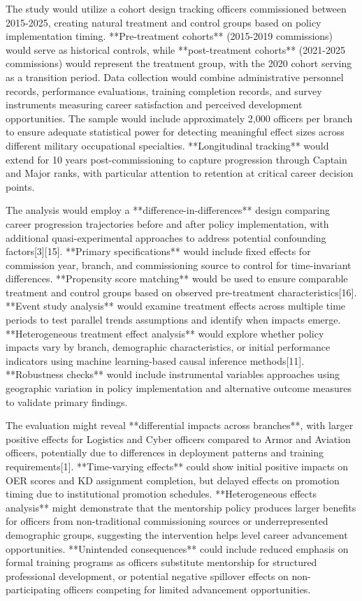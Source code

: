 \documentclass[main.tex]{subfiles}
\begin{document}
The study would utilize a cohort design tracking officers commissioned between 2015-2025, creating natural treatment and control groups based on policy implementation timing. **Pre-treatment cohorts** (2015-2019 commissions) would serve as historical controls, while **post-treatment cohorts** (2021-2025 commissions) would represent the treatment group, with the 2020 cohort serving as a transition period. Data collection would combine administrative personnel records, performance evaluations, training completion records, and survey instruments measuring career satisfaction and perceived development opportunities. The sample would include approximately 2,000 officers per branch to ensure adequate statistical power for detecting meaningful effect sizes across different military occupational specialties. **Longitudinal tracking** would extend for 10 years post-commissioning to capture progression through Captain and Major ranks, with particular attention to retention at critical career decision points.


The analysis would employ a **difference-in-differences** design comparing career progression trajectories before and after policy implementation, with additional quasi-experimental approaches to address potential confounding factors[3][15]. **Primary specifications** would include fixed effects for commission year, branch, and commissioning source to control for time-invariant differences. **Propensity score matching** would be used to ensure comparable treatment and control groups based on observed pre-treatment characteristics[16]. **Event study analysis** would examine treatment effects across multiple time periods to test parallel trends assumptions and identify when impacts emerge. **Heterogeneous treatment effect analysis** would explore whether policy impacts vary by branch, demographic characteristics, or initial performance indicators using machine learning-based causal inference methods[11]. **Robustness checks** would include instrumental variables approaches using geographic variation in policy implementation and alternative outcome measures to validate primary findings.


The evaluation might reveal **differential impacts across branches**, with larger positive effects for Logistics and Cyber officers compared to Armor and Aviation officers, potentially due to differences in deployment patterns and training requirements[1]. **Time-varying effects** could show initial positive impacts on OER scores and KD assignment completion, but delayed effects on promotion timing due to institutional promotion schedules. **Heterogeneous effects analysis** might demonstrate that the mentorship policy produces larger benefits for officers from non-traditional commissioning sources or underrepresented demographic groups, suggesting the intervention helps level career advancement opportunities. **Unintended consequences** could include reduced emphasis on formal training programs as officers substitute mentorship for structured professional development, or potential negative spillover effects on non-participating officers competing for limited advancement opportunities.
\end{document}

